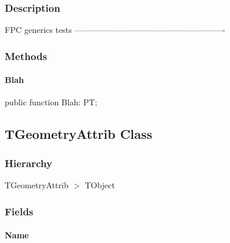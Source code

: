\documentclass{report}
\begin{document}
\subsubsection*{\large{\textbf{Description}}\normalsize\hspace{1ex}\hfill}
FPC generics tests ------------------------------------------------------{-}\subsubsection*{\large{\textbf{Methods}}\normalsize\hspace{1ex}\hfill}
\paragraph*{Blah}\hspace*{\fill}

\begin{list}{}{
\setlength{\itemindent}{0cm}
\setlength{\listparindent}{0cm}
\setlength{\leftmargin}{\evensidemargin}
\addtolength{\leftmargin}{\tmplength}
\settowidth{\labelsep}{X}
\addtolength{\leftmargin}{\labelsep}
\setlength{\labelwidth}{\tmplength}
}
\begin{flushleft}
\item[\textbf{Declaration}\hfill]
\begin{ttfamily}
public function Blah: PT;\end{ttfamily}


\end{flushleft}
\end{list}
\subsection*{TGeometryAttrib Class}
\subsubsection*{\large{\textbf{Hierarchy}}\normalsize\hspace{1ex}\hfill}
TGeometryAttrib {$>$} TObject
\subsubsection*{\large{\textbf{Fields}}\normalsize\hspace{1ex}\hfill}
\paragraph*{Name}\hspace*{\fill}
\end{document}

